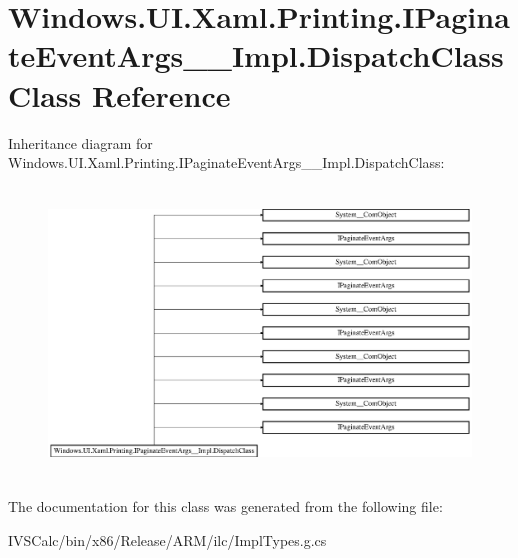 \hypertarget{class_windows_1_1_u_i_1_1_xaml_1_1_printing_1_1_i_paginate_event_args_____impl_1_1_dispatch_class}{}\section{Windows.\+U\+I.\+Xaml.\+Printing.\+I\+Paginate\+Event\+Args\+\_\+\+\_\+\+Impl.\+Dispatch\+Class Class Reference}
\label{class_windows_1_1_u_i_1_1_xaml_1_1_printing_1_1_i_paginate_event_args_____impl_1_1_dispatch_class}
Inheritance diagram for Windows.\+U\+I.\+Xaml.\+Printing.\+I\+Paginate\+Event\+Args\+\_\+\+\_\+\+Impl.\+Dispatch\+Class\+:\begin{figure}[H]
\begin{center}
\leavevmode
\includegraphics[height=7.719297cm]{class_windows_1_1_u_i_1_1_xaml_1_1_printing_1_1_i_paginate_event_args_____impl_1_1_dispatch_class}
\end{center}
\end{figure}


The documentation for this class was generated from the following file\+:\begin{DoxyCompactItemize}
\item 
I\+V\+S\+Calc/bin/x86/\+Release/\+A\+R\+M/ilc/Impl\+Types.\+g.\+cs\end{DoxyCompactItemize}
